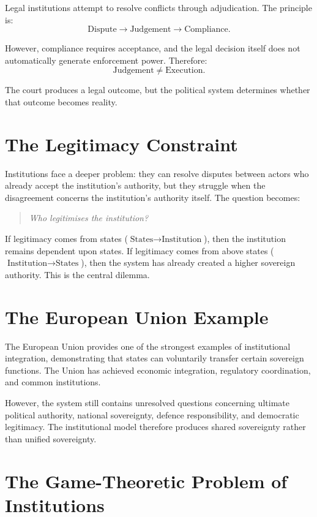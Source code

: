 \documentclass[11pt,openany]{book}
\theoremstyle{plain}
\theoremstyle{definition}
\begin{document}
Legal institutions attempt to resolve conflicts through adjudication. The principle is:
\[
\text{Dispute} \longrightarrow \text{Judgement} \longrightarrow \text{Compliance}.
\]

However, compliance requires acceptance, and the legal decision itself does not automatically generate enforcement power. Therefore:
\[
\text{Judgement} \neq \text{Execution}.
\]

The court produces a legal outcome, but the political system determines whether that outcome becomes reality.

\section*{The Legitimacy Constraint}

Institutions face a deeper problem: they can resolve disputes between actors who already accept the institution's authority, but they struggle when the disagreement concerns the institution's authority itself. The question becomes:
\begin{quote}
\textit{Who legitimises the institution?}
\end{quote}

If legitimacy comes from states (\(\text{States} \to \text{Institution}\)), then the institution remains dependent upon states. If legitimacy comes from above states (\(\text{Institution} \to \text{States}\)), then the system has already created a higher sovereign authority. This is the central dilemma.

\section*{The European Union Example}

The European Union provides one of the strongest examples of institutional integration, demonstrating that states can voluntarily transfer certain sovereign functions. The Union has achieved economic integration, regulatory coordination, and common institutions. 

However, the system still contains unresolved questions concerning ultimate political authority, national sovereignty, defence responsibility, and democratic legitimacy. The institutional model therefore produces shared sovereignty rather than unified sovereignty.

\section*{The Game-Theoretic Problem of Institutions}
\end{document}
